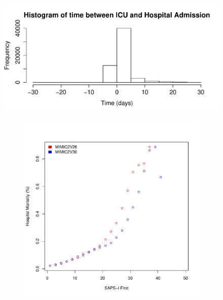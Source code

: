 \documentclass[10pt]{article}
\begin{document}
\begin{figure}
\centering 
\includegraphics[width=0.8\linewidth]{../../figure/hist_hadm_dt.pdf}
\end{figure}


\begin{figure}
\centering
        \begin{subfigure}[b]{0.5\textwidth}
          \includegraphics[width=\linewidth]{../../figure/fig_sapsi_mort.pdf}
        \end{subfigure}%
        \begin{subfigure}[b]{0.5\textwidth}

\end{subfigure}
\end{figure}
\end{document}
